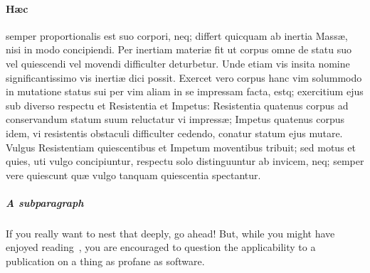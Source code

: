 \documentclass{ansarticle}
\begin{document}
\paragraph{H\ae{}c}
semper proportionalis est suo corpori, neq; differt quicquam ab
inertia Mass\ae{}, nisi in modo concipiendi. Per inertiam materi\ae{} fit ut
corpus omne de statu suo vel quiescendi vel movendi difficulter
deturbetur. Unde etiam vis insita nomine significantissimo vis inerti\ae{}
dici possit. Exercet vero corpus hanc vim solummodo in mutatione
status sui per vim aliam in se impressam facta, estq; exercitium ejus
sub diverso respectu et Resistentia et Impetus: Resistentia quatenus
corpus ad conservandum statum suum reluctatur vi impress\ae{}; Impetus
quatenus corpus idem, vi resistentis obstaculi difficulter cedendo,
conatur statum ejus mutare. Vulgus Resistentiam quiescentibus et
Impetum moventibus tribuit; sed motus et quies, uti vulgo
concipiuntur, respectu solo distinguuntur ab invicem, neq; semper vere
quiescunt qu\ae{} vulgo tanquam quiescentia spectantur.

\subparagraph{A subparagraph} If you really want to nest that deeply, go
ahead! But, while you might have enjoyed
reading~\cite{Wittgenstein21,Wittgenstein81}, you are encouraged to
question the applicability to a publication on a thing as profane as
software.



\end{document}
